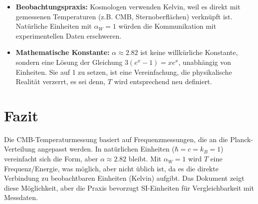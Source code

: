 \documentclass[12pt,a4paper]{article}
\begin{document}
	\begin{itemize}
		\item \textbf{Beobachtungspraxis:} Kosmologen verwenden Kelvin, weil es direkt mit gemessenen Temperaturen (z.B. CMB, Sternoberflächen) verknüpft ist. Natürliche Einheiten mit $\alpha_W = 1$ würden die Kommunikation mit experimentellen Daten erschweren.
		\item \textbf{Mathematische Konstante:} $\alpha \approx 2.82$ ist keine willkürliche Konstante, sondern eine Lösung der Gleichung $3 (e^x - 1) = x e^x$, unabhängig von Einheiten. Sie auf 1 zu setzen, ist eine Vereinfachung, die physikalische Realität verzerrt, es sei denn, $T$ wird entsprechend neu definiert.
	\end{itemize}
	
	\section{Fazit}
	
	Die CMB-Temperaturmessung basiert auf Frequenzmessungen, die an die Planck-Verteilung angepasst werden. In natürlichen Einheiten ($\hbar = c = k_B = 1$) vereinfacht sich die Form, aber $\alpha \approx 2.82$ bleibt. Mit $\alpha_W = 1$ wird $T$ eine Frequenz/Energie, was möglich, aber nicht üblich ist, da es die direkte Verbindung zu beobachtbaren Einheiten (Kelvin) aufgibt. Das Dokument zeigt diese Möglichkeit, aber die Praxis bevorzugt SI-Einheiten für Vergleichbarkeit mit Messdaten.
	
\end{document}

